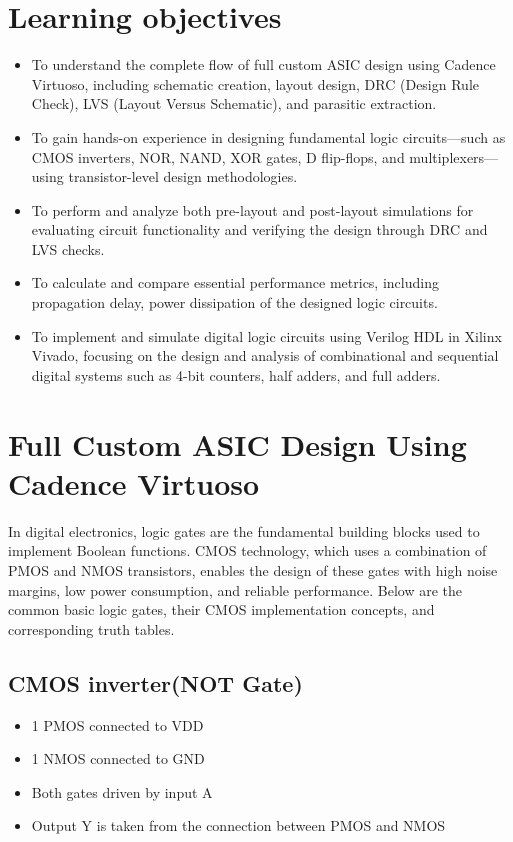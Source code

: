 \documentclass[12pt]{article}
\begin{document}
\section{Learning objectives}
\begin{itemize}
  
\item  To understand the complete flow of full custom ASIC design using Cadence Virtuoso, including schematic creation, layout design, DRC (Design Rule Check), LVS (Layout Versus Schematic), and parasitic extraction.

\item  To gain hands-on experience in designing fundamental logic circuits—such as CMOS inverters, NOR, NAND, XOR gates, D flip-flops, and multiplexers—using transistor-level design methodologies.

\item  To perform and analyze both pre-layout and post-layout simulations for evaluating circuit functionality and verifying the design through DRC and LVS checks.

\item  To calculate and compare essential performance metrics, including propagation delay, power dissipation of the designed logic circuits.

\item  To implement and simulate digital logic circuits using Verilog HDL in Xilinx Vivado, focusing on the design and analysis of combinational and sequential digital systems such as 4-bit counters, half adders, and full adders.


\end{itemize}

\section{Full Custom ASIC Design Using Cadence Virtuoso\label{def}}
In digital electronics, logic gates are the fundamental building blocks used to implement Boolean functions. CMOS technology, which uses a combination of PMOS and NMOS transistors, enables the design of these gates with high noise margins, low power consumption, and reliable performance. Below are the common basic logic gates, their CMOS implementation concepts, and corresponding truth tables. 

\subsection{\large{\textbf{CMOS inverter(NOT Gate)}}}
\begin{itemize}
  \item 1 PMOS connected to VDD
\item 1 NMOS connected to GND
\item Both gates driven by input A
\item Output Y is taken from the connection between PMOS and NMOS
\end{itemize}
	
\end{document}
